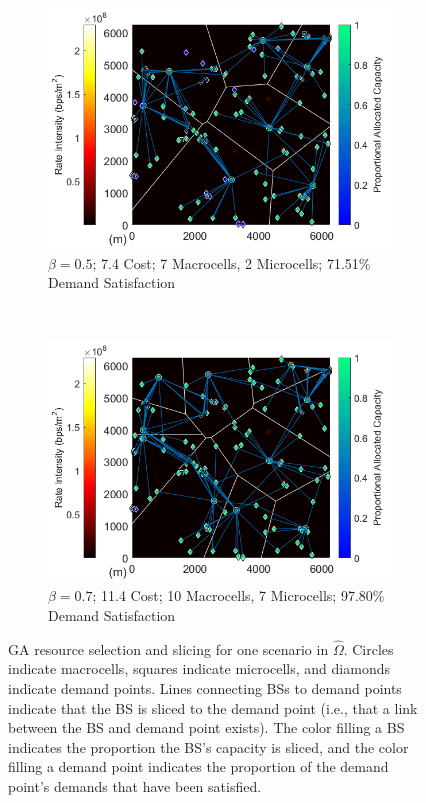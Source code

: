 \documentclass[12pt,dvipsnames]{report}
\begin{document}
\begin{figure}[p]
	\centering
	\begin{subfigure}{.65\textwidth}
		\centering
		\includegraphics[width=1\linewidth]{Figures/CaseII_VoronoiDemandAllocation_GA_b0-5Min_snip2}
		\caption{\small $\beta = 0.5$; 7.4 Cost; 7 Macrocells, 2 Microcells; 71.51\% Demand Satisfaction}
		\label{fig:CaseII_VoronoiDemandAllocation_GA_b0-5Min_snip2}
	\end{subfigure} \\
	\begin{subfigure}{.65\textwidth}
		\centering
		\includegraphics[width=1\linewidth]{Figures/CaseII_VoronoiDemandAllocation_GA_b0-7Max_snip2}
		\caption{\small $\beta = 0.7$; 11.4 Cost; 10 Macrocells, 7 Microcells; 97.80\% Demand Satisfaction}
		\label{fig:CaseII_VoronoiDemandAllocation_GA_b0-7Max_snip2}
	\end{subfigure}
	\caption[Two Case II GA resource selection and slicing solutions]{GA resource selection and slicing for one scenario in $\hat{\Omega}$.  Circles indicate macrocells, squares indicate microcells, and diamonds indicate demand points.  Lines connecting BSs to demand points indicate that the BS is sliced to the demand point (i.e., that a link between the BS and demand point exists).  The color filling a BS indicates the proportion the BS's capacity is sliced, and the color filling a demand point indicates the proportion of the demand point's demands that have been satisfied.}
	\label{fig:CaseII_VoronoiDemandAllocation_GA}
\end{figure}
\end{document}
